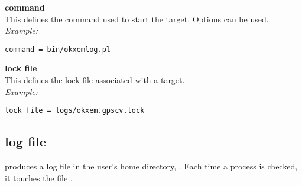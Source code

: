 {\bfseries command}\\
This defines the command used to start the target. Options can be used.\\
\textit{Example:}
\begin{lstlisting}
command = bin/okxemlog.pl 
\end{lstlisting}

{\bfseries lock file}\\
This defines the lock file associated with a target.\\
\textit{Example:}
\begin{lstlisting}
lock file = logs/okxem.gpscv.lock
\end{lstlisting}



\subsection{log file}

 produces a log file in the user's home directory, . Each time 
a process is checked, it touches the file .